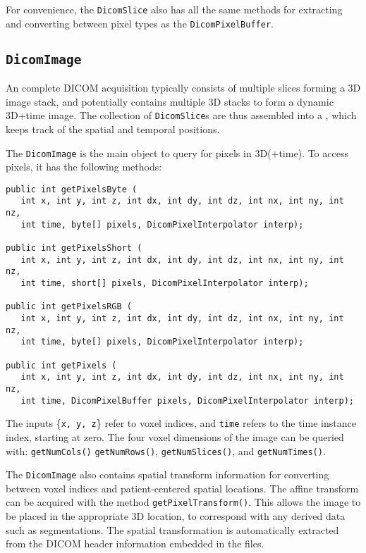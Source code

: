 For convenience, the \lstinline{DicomSlice} also has all the same methods 
for extracting and converting between pixel types as the \lstinline{DicomPixelBuffer}.

\subsection{\texttt{DicomImage}}

An complete DICOM acquisition typically consists of multiple slices forming a 3D image stack,
and potentially contains multiple 3D stacks to form a dynamic 3D+time image.  The collection
of \lstinline{DicomSlice}s are thus assembled into a , 
which keeps track of the spatial and temporal positions.

The \lstinline{DicomImage} is the main object to query for pixels in 3D(+time).  To access pixels,
it has the following methods:
\begin{lstlisting}[]
public int getPixelsByte (
   int x, int y, int z, int dx, int dy, int dz, int nx, int ny, int nz, 
   int time, byte[] pixels, DicomPixelInterpolator interp);

public int getPixelsShort (
   int x, int y, int z, int dx, int dy, int dz, int nx, int ny, int nz, 
   int time, short[] pixels, DicomPixelInterpolator interp);

public int getPixelsRGB (
   int x, int y, int z, int dx, int dy, int dz, int nx, int ny, int nz, 
   int time, byte[] pixels, DicomPixelInterpolator interp);

public int getPixels (
   int x, int y, int z, int dx, int dy, int dz, int nx, int ny, int nz, 
   int time, DicomPixelBuffer pixels, DicomPixelInterpolator interp);
\end{lstlisting}
The inputs \{\lstinline{x, y, z}\} refer to voxel indices, and \lstinline{time} refers to the time instance index, starting at zero.  The four voxel dimensions of the image can be queried with: \lstinline{getNumCols()} \lstinline{getNumRows()}, \lstinline{getNumSlices()}, and \lstinline{getNumTimes()}.

The \lstinline{DicomImage} also contains spatial transform information for converting between voxel indices and patient-centered spatial locations.  The affine transform can be acquired with the method \lstinline{getPixelTransform()}.  This allows the image to be placed in the appropriate 3D location, to correspond with any derived data such as segmentations.  The spatial transformation is automatically extracted from the DICOM header information embedded in the files.

